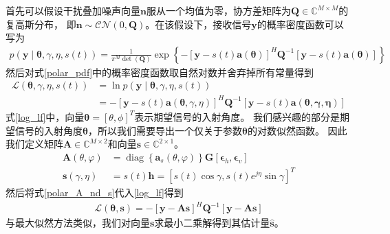\documentclass[master]{thesis-uestc}
\begin{document}
首先可以假设干扰叠加噪声向量$\bm{n}$服从一个均值为零，协方差矩阵为$\bm{Q}\in\mathbb{C}^{M\times M}$的复高斯分布，
即$\bm{n}\sim\mathcal{CN}(0,\bm{Q})$。在该假设下，接收信号$\bm{y}$的概率密度函数可以写为
\begin{equation}\label{polar_pdf}
    \begin{aligned}
        p(\bm{y} \mid \bm{\theta}, \gamma, \eta, s(t))= 
        \frac{1}{\pi^{M} \operatorname{det}(\bm{Q})} \exp 
        \left\{
            -[\bm{y}-s(t) \bm{a}(\bm{\theta})]^{H} 
            \bm{Q}^{-1}[\bm{y}-s(t) \bm{a}(\bm{\theta})]
            \right\}
    \end{aligned}
\end{equation}
然后对式\eqref{polar_pdf}中的概率密度函数取自然对数并舍弃掉所有常量得到
\begin{equation}\label{log_lf}
    \begin{aligned}
        \mathcal{L}(\bm{\theta}, \gamma, \eta, s(t)) &=
        \ln p(\bm{y} \mid \bm{\theta}, \gamma, \eta, s(t)) \\
        &=-[\bm{y}-s(t) \bm{a}(\bm{\theta},\gamma,\eta)]^{H} \bm{Q}^{-1}[\bm{y}-s(t) \bm{a}(\bm{\theta,\gamma,\eta})]
    \end{aligned}
\end{equation}
式\eqref{log_lf}中，向量$\bm{\theta}=\left[\theta,\phi\right]^T$表示期望信号的入射角度。
我们感兴趣的部分是期望信号的入射角度$\bm{\theta}$，所以我们需要导出一个仅关于参数$\bm{\theta}$的对数似然函数。
因此我们定义矩阵$\bm{A}\in\mathbb{C}^{M\times2}$和向量$\bm{s}\in\mathbb{C}^{2\times1}$。
\begin{subequations}\label{polar_A_nd_s}
    \begin{align}
            \bm{A}(\theta, \varphi) &=
            \operatorname{diag}\left\{\bm{a}_{s}(\theta, \varphi)\right\} \bm{G}
            \left[\bm{\epsilon}_{h}, \bm{\epsilon}_{v}\right] \\
            \bm{s}(\gamma, \eta) &=s(t) \bm{h}=\left[s(t) \cos \gamma, s(t) e^{j \eta} \sin \gamma\right]^{T}
    \end{align}
\end{subequations}
然后将式\eqref{polar_A_nd_s}代入\eqref{log_lf}得到
\begin{equation}\label{polar_log_lf_As}
    \begin{aligned}
        \mathcal{L}(\bm{\theta}, \bm{s})=
        -[\bm{y}-\bm{A} \bm{s}]^{H}{\bm{Q}}^{-1}[\bm{y}-\bm{A} \bm{s}]
    \end{aligned}
\end{equation}
与最大似然方法类似，我们对向量$\bm{s}$求最小二乘解得到其估计量$\hat{\bm{s}}$。
\end{document}
